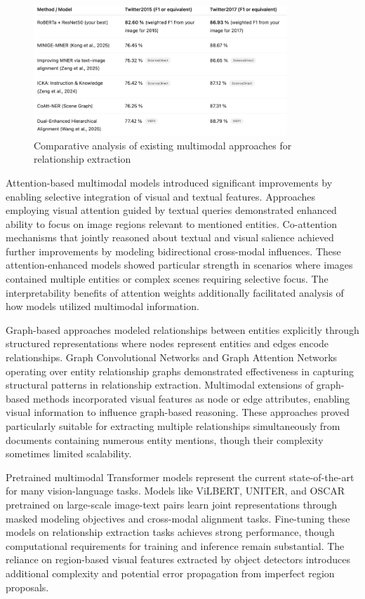 \documentclass[12pt,a4paper]{report}
\begin{document}
\begin{figure}[H]
\centering
\includegraphics[width=0.85\textwidth]{literatureReview.png}
\caption{Comparative analysis of existing multimodal approaches for relationship extraction}
\label{fig:literature}
\end{figure}

Attention-based multimodal models introduced significant improvements by enabling selective integration of visual and textual features. Approaches employing visual attention guided by textual queries demonstrated enhanced ability to focus on image regions relevant to mentioned entities. Co-attention mechanisms that jointly reasoned about textual and visual salience achieved further improvements by modeling bidirectional cross-modal influences. These attention-enhanced models showed particular strength in scenarios where images contained multiple entities or complex scenes requiring selective focus. The interpretability benefits of attention weights additionally facilitated analysis of how models utilized multimodal information.

Graph-based approaches modeled relationships between entities explicitly through structured representations where nodes represent entities and edges encode relationships. Graph Convolutional Networks and Graph Attention Networks operating over entity relationship graphs demonstrated effectiveness in capturing structural patterns in relationship extraction. Multimodal extensions of graph-based methods incorporated visual features as node or edge attributes, enabling visual information to influence graph-based reasoning. These approaches proved particularly suitable for extracting multiple relationships simultaneously from documents containing numerous entity mentions, though their complexity sometimes limited scalability.

Pretrained multimodal Transformer models represent the current state-of-the-art for many vision-language tasks. Models like ViLBERT, UNITER, and OSCAR pretrained on large-scale image-text pairs learn joint representations through masked modeling objectives and cross-modal alignment tasks. Fine-tuning these models on relationship extraction tasks achieves strong performance, though computational requirements for training and inference remain substantial. The reliance on region-based visual features extracted by object detectors introduces additional complexity and potential error propagation from imperfect region proposals.
\end{document}
